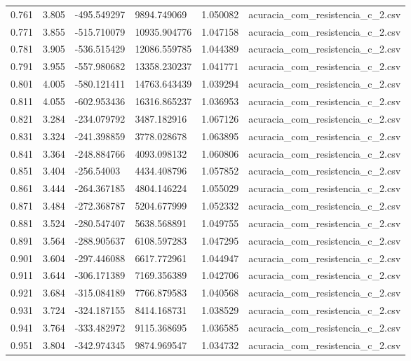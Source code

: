 \begin{table}
\begin{tabular}{llllll}
0.761 & 3.805 & -495.549297 & 9894.749069 & 1.050082 & acuracia\_com\_resistencia\_c\_2.csv \\
0.771 & 3.855 & -515.710079 & 10935.904776 & 1.047158 & acuracia\_com\_resistencia\_c\_2.csv \\
0.781 & 3.905 & -536.515429 & 12086.559785 & 1.044389 & acuracia\_com\_resistencia\_c\_2.csv \\
0.791 & 3.955 & -557.980682 & 13358.230237 & 1.041771 & acuracia\_com\_resistencia\_c\_2.csv \\
0.801 & 4.005 & -580.121411 & 14763.643439 & 1.039294 & acuracia\_com\_resistencia\_c\_2.csv \\
0.811 & 4.055 & -602.953436 & 16316.865237 & 1.036953 & acuracia\_com\_resistencia\_c\_2.csv \\
0.821 & 3.284 & -234.079792 & 3487.182916 & 1.067126 & acuracia\_com\_resistencia\_c\_2.csv \\
0.831 & 3.324 & -241.398859 & 3778.028678 & 1.063895 & acuracia\_com\_resistencia\_c\_2.csv \\
0.841 & 3.364 & -248.884766 & 4093.098132 & 1.060806 & acuracia\_com\_resistencia\_c\_2.csv \\
0.851 & 3.404 & -256.54003 & 4434.408796 & 1.057852 & acuracia\_com\_resistencia\_c\_2.csv \\
0.861 & 3.444 & -264.367185 & 4804.146224 & 1.055029 & acuracia\_com\_resistencia\_c\_2.csv \\
0.871 & 3.484 & -272.368787 & 5204.677999 & 1.052332 & acuracia\_com\_resistencia\_c\_2.csv \\
0.881 & 3.524 & -280.547407 & 5638.568891 & 1.049755 & acuracia\_com\_resistencia\_c\_2.csv \\
0.891 & 3.564 & -288.905637 & 6108.597283 & 1.047295 & acuracia\_com\_resistencia\_c\_2.csv \\
0.901 & 3.604 & -297.446088 & 6617.772961 & 1.044947 & acuracia\_com\_resistencia\_c\_2.csv \\
0.911 & 3.644 & -306.171389 & 7169.356389 & 1.042706 & acuracia\_com\_resistencia\_c\_2.csv \\
0.921 & 3.684 & -315.084189 & 7766.879583 & 1.040568 & acuracia\_com\_resistencia\_c\_2.csv \\
0.931 & 3.724 & -324.187155 & 8414.168731 & 1.038529 & acuracia\_com\_resistencia\_c\_2.csv \\
0.941 & 3.764 & -333.482972 & 9115.368695 & 1.036585 & acuracia\_com\_resistencia\_c\_2.csv \\
0.951 & 3.804 & -342.974345 & 9874.969547 & 1.034732 & acuracia\_com\_resistencia\_c\_2.csv \\

\end{tabular}
\end{table}
